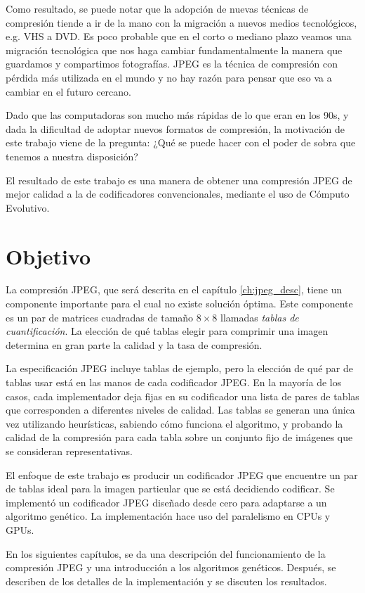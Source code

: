 Como resultado, se puede notar que la adopción de nuevas técnicas de compresión
tiende a ir de la mano con la migración a nuevos medios tecnológicos, e.g. VHS
a DVD. Es poco probable que en el corto o mediano plazo veamos una migración
tecnológica que nos haga cambiar fundamentalmente la manera que guardamos y
compartimos fotografías. JPEG es la técnica de \gls{compresión con pérdida} más
utilizada en el mundo y no hay razón para pensar que eso va a cambiar en el
futuro cercano.

Dado que las computadoras son mucho más rápidas de lo que eran en los 90s, y
dada la dificultad de adoptar nuevos formatos de compresión, la motivación de
este trabajo viene de la pregunta:  ¿Qué se puede hacer con el poder de sobra
que tenemos a nuestra disposición?

El resultado de este trabajo es una manera de obtener una compresión JPEG de mejor
calidad a la de codificadores convencionales, mediante el uso de \gls{Cómputo Evolutivo}.

\section{Objetivo}

La compresión JPEG, que será descrita en el capítulo \ref{ch:jpeg_desc}, tiene
un componente importante para el cual no existe solución óptima. Este
componente es un par de matrices cuadradas de tamaño $8\times8$ llamadas
\emph{\gls{tablas de cuantificación}}. La elección de qué tablas elegir para
comprimir una imagen determina en gran parte la calidad y la tasa de compresión.

La especificación JPEG \cite{jpeg-spec} incluye tablas de ejemplo, pero la
elección de qué par de tablas usar está en las manos de cada codificador
JPEG. En la mayoría de los casos, cada implementador deja fijas en su
codificador una lista de pares de tablas que corresponden a diferentes
niveles de calidad. Las tablas se generan una única vez utilizando heurísticas,
sabiendo cómo funciona el algoritmo, y probando la calidad de la compresión
para cada tabla sobre un conjunto fijo de imágenes que se consideran
representativas.

El enfoque de este trabajo es producir un codificador JPEG que encuentre un par
de tablas ideal para la imagen particular que se está decidiendo codificar.
Se implementó un codificador JPEG diseñado desde cero para adaptarse a un
algoritmo genético. La implementación hace uso del paralelismo en CPUs y GPUs.

En los siguientes capítulos, se da una descripción del funcionamiento de la
compresión JPEG y una introducción a los algoritmos genéticos. Después, se
describen de los detalles de la implementación y se discuten los resultados.


